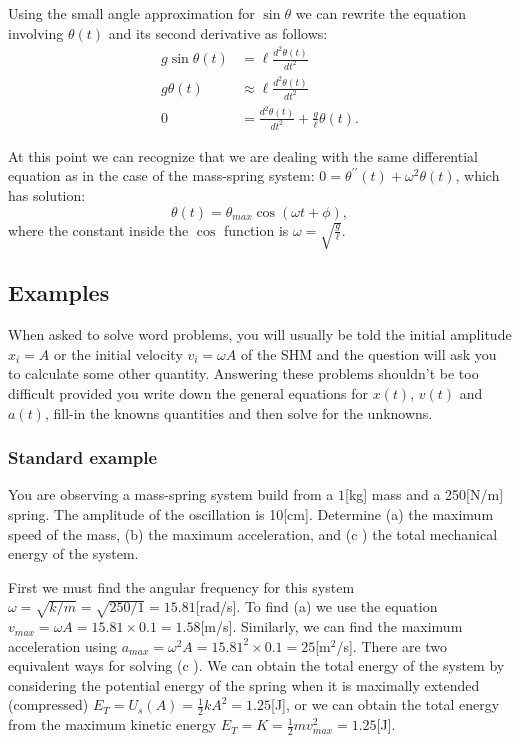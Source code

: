 \documentclass[letterpaper,9pt,journal]{IEEEtran}
\begin{document}
Using the small angle approximation for $\sin\theta$ we can rewrite the 
equation involving $\theta(t)$ and its second derivative as follows:
\begin{align*}
  g\sin\theta(t)	&= 		\ell \frac{d^2\theta(t)}{dt^2} 		\\
  g\theta(t)		&\approx 	\ell \frac{d^2\theta(t)}{dt^2} 		\\
  0			&=		\frac{d^2\theta(t)}{dt^2}+ \frac{g}{\ell}\theta(t).
\end{align*}

At this point we can recognize that we are dealing with the same differential
equation as in the case of the mass-spring system: $0 = \theta^{\prime\prime}(t)+\omega^2 \theta(t)$,
which has solution:
\[
 \theta(t) = \theta_{max}\cos(\omega t + \phi),
\]
where the constant inside the $\cos$ function is $\omega=\sqrt{\frac{g}{\ell}}$.


\subsection{Examples}
\label{bfebe34154a0dfd9fc7b447fc9ed74e9}%

When asked to solve word problems, you will usually be told the initial amplitude 
$x_i=A$ or the initial velocity $v_i=\omega A$ of the SHM and the question
will ask you to calculate some other quantity. 
Answering these problems shouldn't be too difficult provided you write down the 
general equations for $x(t)$, $v(t)$ and $a(t)$, fill-in the knowns quantities
and then solve for the unknowns.


\subsubsection{Standard example}

You are observing a mass-spring system build from a $1$[kg] mass and a 250[N/m] spring.
The amplitude of the oscillation is 10[cm]. Determine (a) the maximum speed of the mass, 
(b) the maximum acceleration, and (c ) the total mechanical energy of the system.

First we must find the angular frequency for this system $\omega = \sqrt{k/m}=\sqrt{250/1}=15.81$[rad/s].
To find (a) we use the equation $v_{max} = \omega A = 15.81 \times 0.1=1.58$[m/s].
Similarly, we can find the maximum acceleration using $a_{max} = \omega^2 A = 15.81^2 \times 0.1=25$[m$^2$/s].
There are two equivalent ways for solving (c ). 
We can obtain the  total energy of the system by considering the potential energy of the spring when 
it is maximally extended (compressed) $E_T=U_s(A) = \frac{1}{2}kA^2 = 1.25$[J], 
or we can obtain the total energy from the maximum kinetic energy $E_T=K=\frac{1}{2}m v_{max}^2 = 1.25$[J].
\end{document}
